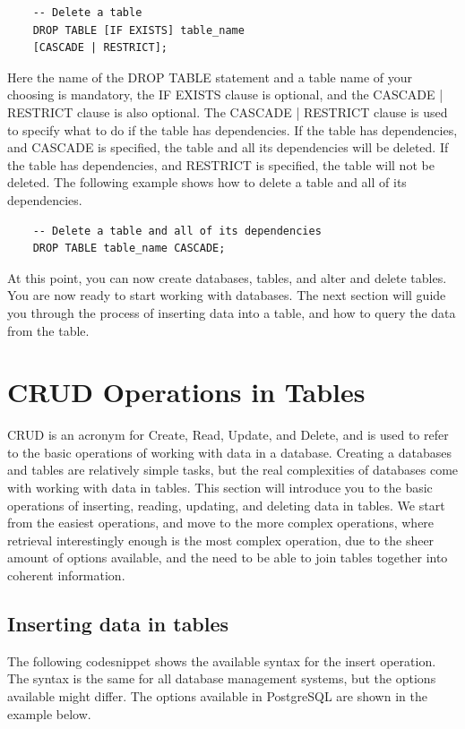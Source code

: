 \begin{verbatim}
    -- Delete a table
    DROP TABLE [IF EXISTS] table_name 
    [CASCADE | RESTRICT];
\end{verbatim}

Here the name of the DROP TABLE statement and a table name of your choosing is mandatory, the IF EXISTS clause is optional, and the CASCADE | RESTRICT clause is also optional. The CASCADE | RESTRICT clause is used to specify what to do if the table has dependencies. If the table has dependencies, and CASCADE is specified, the table and all its dependencies will be deleted. If the table has dependencies, and RESTRICT is specified, the table will not be deleted. The following example shows how to delete a table and all of its dependencies.

\begin{verbatim}
    -- Delete a table and all of its dependencies
    DROP TABLE table_name CASCADE;
\end{verbatim}

At this point, you can now create databases, tables, and alter and delete tables. You are now ready to start working with databases. The next section will guide you through the process of inserting data into a table, and how to query the data from the table.

\section{CRUD Operations in Tables}
CRUD is an acronym for Create, Read, Update, and Delete, and is used to refer to the basic operations of working with data in a database. Creating a databases and tables are relatively simple tasks, but the real complexities of databases come with working with data in tables. This section will introduce you to the basic operations of inserting, reading, updating, and deleting data in tables. We start from the easiest operations, and move to the more complex operations, where retrieval interestingly enough is the most complex operation, due to the sheer amount of options available, and the need to be able to join tables together into coherent information.

\subsection{Inserting data in tables}
The following codesnippet shows the available syntax for the insert operation. The syntax is the same for all database management systems, but the options available might differ. The options available in PostgreSQL are shown in the example below.

